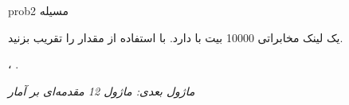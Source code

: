 \begin{PSbox}[unbreakable]{prob}{مسیله 2}

یک لینک مخابراتی 10000 بیت با  دارد. با استفاده از  مقدار  را تقریب بزنید.

\PSsolution{} ، .\PSbr{}

\end{PSbox}

\emph{ماژول بعدی: {ماژول 12  مقدمه‌ای بر آمار}}
